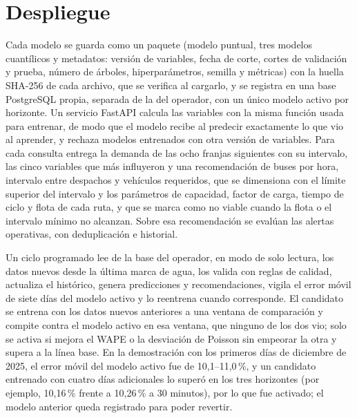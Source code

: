 \documentclass[11pt,a4paper]{article}
\begin{document}
\section{Despliegue}
\label{sec:despliegue}

Cada modelo se guarda como un paquete (modelo puntual, tres modelos cuantílicos y metadatos: versión de variables, fecha de corte, cortes de validación y prueba, número de árboles, hiperparámetros, semilla y métricas) con la huella SHA-256 de cada archivo, que se verifica al cargarlo, y se registra en una base PostgreSQL propia, separada de la del operador, con un único modelo activo por horizonte. Un servicio FastAPI calcula las variables con la misma función usada para entrenar, de modo que el modelo recibe al predecir exactamente lo que vio al aprender, y rechaza modelos entrenados con otra versión de variables. Para cada consulta entrega la demanda de las ocho franjas siguientes con su intervalo, las cinco variables que más influyeron y una recomendación de buses por hora, intervalo entre despachos y vehículos requeridos, que se dimensiona con el límite superior del intervalo y los parámetros de capacidad, factor de carga, tiempo de ciclo y flota de cada ruta, y que se marca como no viable cuando la flota o el intervalo mínimo no alcanzan. Sobre esa recomendación se evalúan las alertas operativas, con deduplicación e historial.

Un ciclo programado lee de la base del operador, en modo de solo lectura, los datos nuevos desde la última marca de agua, los valida con reglas de calidad, actualiza el histórico, genera predicciones y recomendaciones, vigila el error móvil de siete días del modelo activo y lo reentrena cuando corresponde. El candidato se entrena con los datos nuevos anteriores a una ventana de comparación y compite contra el modelo activo en esa ventana, que ninguno de los dos vio; solo se activa si mejora el WAPE o la desviación de Poisson sin empeorar la otra y supera a la línea base. En la demostración con los primeros días de diciembre de 2025, el error móvil del modelo activo fue de 10,1--11,0\,\%, y un candidato entrenado con cuatro días adicionales lo superó en los tres horizontes (por ejemplo, 10,16\,\% frente a 10,26\,\% a 30 minutos), por lo que fue activado; el modelo anterior queda registrado para poder revertir.

\end{document}
